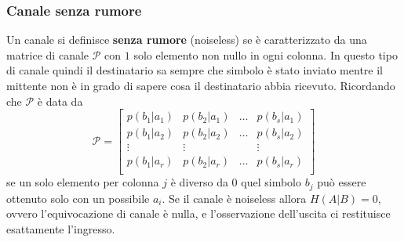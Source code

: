\subsubsection{Canale senza rumore}
Un canale si definisce \textbf{senza rumore} (noiseless) se è caratterizzato da una matrice di canale $\mathcal{P}$ con $1$ solo elemento non
nullo in ogni colonna. In questo tipo di canale quindi il destinatario sa sempre che simbolo \`e stato inviato mentre il mittente non è in grado di sapere cosa il destinatario abbia ricevuto. Ricordando che $\mathcal{P}$ \`e data da
\begin{equation}
    \mathcal{P} = \begin{bmatrix}
    p(b_1|a_1) & p(b_2|a_1) & \dots & p(b_s|a_1) \\
    p(b_1|a_2) & p(b_2|a_2) & \dots & p(b_s|a_2) \\
    \vdots & \vdots & & \vdots \\
     p(b_1|a_r) & p(b_2|a_r) & \dots & p(b_s|a_r) \\
    \end{bmatrix}
\end{equation}
se un solo elemento per colonna $j$ \`e diverso da $0$ quel simbolo $b_j$ pu\`o essere ottenuto solo con un possibile $a_i$.
Se il canale è noiseless allora $H(A|B) = 0$, ovvero l’equivocazione di canale è nulla, e l'osservazione dell’uscita ci restituisce esattamente l’ingresso.

